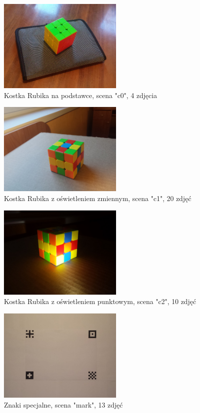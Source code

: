 \begin{figure}[h]
   \centering
   \includegraphics[width=6cm]{img/c0.jpg}
   \caption{Kostka Rubika na podstawce, scena "c0", 4 zdjęcia}
   \label {fig:scene_c0}
\end{figure}
\begin{figure}[h]
   \centering
   \includegraphics[width=6cm]{img/c1.jpg}
   \caption{Kostka Rubika z oświetleniem zmiennym, scena "c1", 20 zdjęć}
   \label {fig:scene_c1}
\end{figure}
\begin{figure}[h]
   \centering
   \includegraphics[width=6cm]{img/c2.jpg}
   \caption{Kostka Rubika z oświetleniem punktowym, scena "c2", 10 zdjęć}
   \label {fig:scene_c2}
\end{figure}
\begin{figure}[h]
   \centering
   \includegraphics[width=6cm]{img/mark.jpg}
   \caption{Znaki specjalne, scena "mark", 13 zdjęć}
   \label {fig:scene_mark}
\end{figure}
